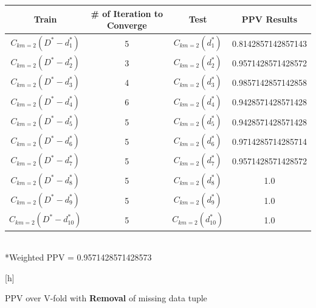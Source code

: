 \documentclass{article}
\begin{document}
\begin{enumerate}
\begin{table}[h]
				\centering
				\begin{tabular}{c||c| c|c}
					\\
					\hline
					Train & \# of Iteration to Converge & Test & PPV Results\\
					\hline
					$C_{km=2}(D^* - d^*_1)$ & 5 & $C_{km=2}( d^*_1)$&0.8142857142857143\\
					$C_{km=2}(D^* - d^*_2)$ & 3 & $C_{km=2}( d^*_2)$&0.9571428571428572\\
					$C_{km=2}(D^* - d^*_3)$ & 4 & $C_{km=2}( d^*_3)$&0.9857142857142858\\
					$C_{km=2}(D^* - d^*_4)$ & 6 & $C_{km=2}( d^*_4)$&0.9428571428571428\\
					$C_{km=2}(D^* - d^*_5)$ & 5 & $C_{km=2}( d^*_5)$&0.9428571428571428\\
					$C_{km=2}(D^* - d^*_6)$ & 5 & $C_{km=2}( d^*_6)$&0.9714285714285714\\
					$C_{km=2}(D^* - d^*_7)$ & 5 & $C_{km=2}( d^*_7)$&0.9571428571428572\\
					$C_{km=2}(D^* - d^*_8)$ & 5 & $C_{km=2}( d^*_8)$&1.0\\
					$C_{km=2}(D^* - d^*_9)$ & 5 & $C_{km=2}( d^*_9)$ &1.0\\
					$C_{km=2}(D^* - d^*_10)$ & 5 & $C_{km=2}( d^*_10)$&1.0\\
					\hline	
				\end{tabular} \\
				*Weighted PPV = 0.9571428571428573
			\end{table}[h] \\		


			\begin{table}[h]
				\caption{PPV over V-fold with \textbf{Removal} of missing data tuple}


\end{table}
\end{enumerate}
\end{document}
